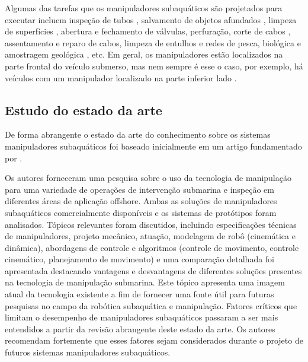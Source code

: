Algumas das tarefas que os manipuladores subaquáticos são projetados para executar incluem inspeção de tubos \cite{christ2013rov}, salvamento de objetos afundados \cite{chang2004distance}, limpeza de superfícies \cite{davey1999non}, abertura e fechamento de válvulas, perfuração, corte de cabos \cite{christ2013rov}, assentamento e reparo de cabos, limpeza de entulhos e redes de pesca, biológica \cite{jones2009using} e amostragem geológica \cite{noe2006surface}, etc. Em geral, os manipuladores estão localizados na parte frontal do veículo submerso, mas nem sempre é esse o caso, por exemplo, há veículos com um manipulador localizado na parte inferior lado \cite{ribas2011girona}.

\subsection{Estudo do estado da arte}
\label{sec:sotamani}
De forma abrangente o estado da arte do conhecimento sobre os sistemas manipuladores subaquáticos foi baseado inicialmente em um artigo fundamentado por . 

Os autores forneceram uma pesquisa sobre o uso da tecnologia de manipulação para uma variedade de operações de intervenção submarina e inspeção em diferentes áreas de aplicação offshore. Ambas as soluções de manipuladores subaquáticos comercialmente disponíveis e os sistemas de protótipos foram analisados. Tópicos relevantes foram discutidos, incluindo especificações técnicas de manipuladores, projeto mecânico, atuação, modelagem de robô (cinemática e dinâmica), abordagens de controle e algoritmos (controle de movimento, controle cinemático, planejamento de movimento) e uma comparação detalhada foi apresentada destacando vantagens e desvantagens de diferentes soluções presentes na tecnologia de manipulação submarina. Este tópico apresenta uma imagem atual da tecnologia existente a fim de fornecer uma fonte útil para futuras pesquisas no campo da robótica subaquática e manipulação. Fatores críticos que limitam o desempenho de manipuladores subaquáticos passaram a ser mais entendidos a partir da revisão abrangente deste estado da arte. Os autores recomendam fortemente que esses fatores sejam considerados durante o projeto de futuros sistemas manipuladores subaquáticos.


